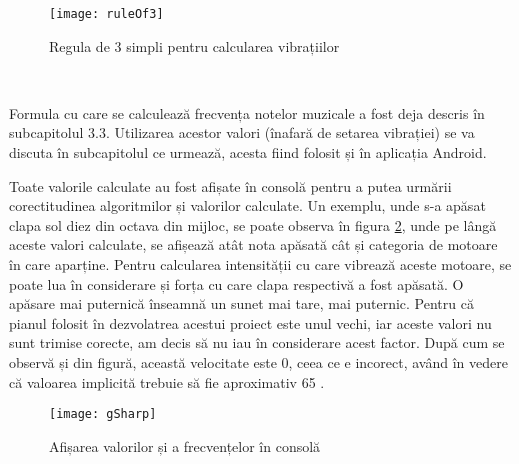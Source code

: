 \documentclass[../IoMusT.tex]{subfiles}
\begin{document}
\begin{figure}[h]
\centering
\texttt{[image: ruleOf3]}
\caption{Regula de 3 simpli pentru calcularea vibrațiilor}
\label{fig:ruleOf3}
\end{figure}  
\\
\par Formula cu care se calculează frecvența notelor muzicale a fost deja descris în subcapitolul 3.3. Utilizarea acestor valori (înafară de setarea vibrației) se va discuta în subcapitolul ce urmează, acesta fiind folosit și în aplicația Android.
\\
\par Toate valorile calculate au fost afișate în consolă pentru a putea urmării corectitudinea algoritmilor și valorilor calculate. Un exemplu, unde s-a apăsat clapa sol diez din octava din mijloc, se poate observa în figura \ref{fig:gSharp}, unde pe lângă aceste valori calculate, se afișează atât nota apăsată cât și categoria de motoare în care aparține. Pentru calcularea intensității cu care vibrează aceste motoare, se poate lua în considerare și forța cu care clapa respectivă a fost apăsată. O apăsare mai puternică înseamnă un sunet mai tare, mai puternic. Pentru că pianul folosit în dezvolatrea acestui proiect este unul vechi, iar aceste valori nu sunt trimise corecte, am decis să nu iau în considerare acest factor. După cum se observă și din figură, această velocitate este 0, ceea ce e incorect, având în vedere că valoarea implicită trebuie să fie aproximativ 65 \cite{Mido}.
\begin{figure}[h]
\centering
\texttt{[image: gSharp]}
\caption{Afișarea valorilor și a frecvențelor în consolă}
\label{fig:gSharp}
\end{figure}  
\end{document}
